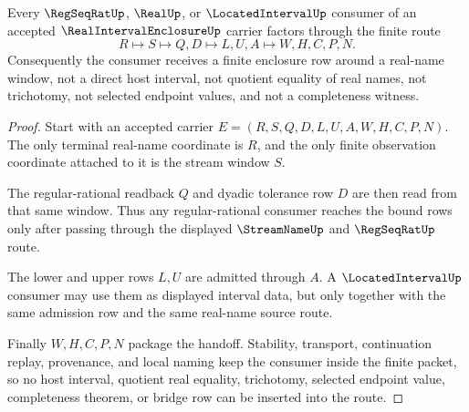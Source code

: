 \begin{theorem}
\label{thm:real-interval-enclosure-regseqrat-window-handoff}
Every $\RegSeqRatUp$, $\RealUp$, or $\LocatedIntervalUp$ consumer of an accepted $\RealIntervalEnclosureUp$ carrier factors through the finite route
$$
R \longmapsto S \longmapsto Q,D \longmapsto L,U,A \longmapsto W,H,C,P,N .
$$
Consequently the consumer receives a finite enclosure row around a real-name window, not a direct host interval, not quotient equality of real names, not trichotomy, not selected endpoint values, and not a completeness witness.
\end{theorem}
\begin{proof}
Start with an accepted carrier $E=(R,S,Q,D,L,U,A,W,H,C,P,N)$. The only terminal real-name coordinate is $R$, and the only finite observation coordinate attached to it is the stream window $S$.

The regular-rational readback $Q$ and dyadic tolerance row $D$ are then read from that same window. Thus any regular-rational consumer reaches the bound rows only after passing through the displayed $\StreamNameUp$ and $\RegSeqRatUp$ route.

The lower and upper rows $L,U$ are admitted through $A$. A $\LocatedIntervalUp$ consumer may use them as displayed interval data, but only together with the same admission row and the same real-name source route.

Finally $W,H,C,P,N$ package the handoff. Stability, transport, continuation replay, provenance, and local naming keep the consumer inside the finite packet, so no host interval, quotient real equality, trichotomy, selected endpoint value, completeness theorem, or bridge row can be inserted into the route.
\end{proof}


\begin{closurestatus}{\RealIntervalEnclosureUp}
  \theoryclosure{\seedClosure}
  \formalstatus{\unformalizedV}
\end{closurestatus}
